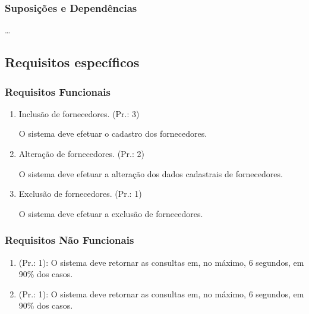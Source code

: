 	\subsubsection{Suposições e Dependências}
	\ldots
	
	
\subsection{Requisitos específicos}

\subsubsection{Requisitos Funcionais}
\begin{enumerate}[
	label=RF\arabic{*}, 
	ref=(RF\arabic{*}),
	leftmargin=1.5em,
	itemindent=4.5em]
\item Inclusão de fornecedores. (Pr.: 3)\par
O sistema deve efetuar o cadastro dos fornecedores.\par
\item Alteração de fornecedores. (Pr.: 2)\par
O sistema deve efetuar a alteração dos dados cadastrais de fornecedores.\par
\item Exclusão de fornecedores. (Pr.: 1)\par
O sistema deve efetuar a exclusão de fornecedores.\par
\end{enumerate}

\subsubsection{Requisitos Não Funcionais}
\begin{enumerate}[
	label=RNF\arabic{*}, 
	ref=(RNF\arabic{*}),
	leftmargin=1.5em,
	itemindent=4.5em]
\item (Pr.: 1): O sistema deve retornar as consultas em, no máximo, 6 segundos, em 90\% dos casos.
\item (Pr.: 1): O sistema deve retornar as consultas em, no máximo, 6 segundos, em 90\% dos casos.
\end{enumerate}
